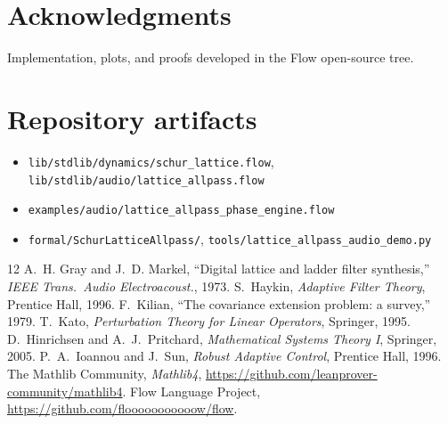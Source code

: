 \documentclass[11pt]{article}
\begin{document}
\section*{Acknowledgments}
Implementation, plots, and proofs developed in the Flow open-source tree.

\appendix
\section{Repository artifacts}
\begin{itemize}
  \item \texttt{lib/stdlib/dynamics/schur\_lattice.flow}, \texttt{lib/stdlib/audio/lattice\_allpass.flow}
  \item \texttt{examples/audio/lattice\_allpass\_phase\_engine.flow}
  \item \texttt{formal/SchurLatticeAllpass/}, \texttt{tools/lattice\_allpass\_audio\_demo.py}
\end{itemize}

\begin{thebibliography}{12}
 A.~H. Gray and J.~D. Markel, ``Digital lattice and ladder filter synthesis,'' \emph{IEEE Trans.\ Audio Electroacoust.}, 1973.
 S.~Haykin, \emph{Adaptive Filter Theory}, Prentice Hall, 1996.
 F.~Kilian, ``The covariance extension problem: a survey,'' 1979.
 T.~Kato, \emph{Perturbation Theory for Linear Operators}, Springer, 1995.
 D.~Hinrichsen and A.~J.~Pritchard, \emph{Mathematical Systems Theory I}, Springer, 2005.
 P.~A.~Ioannou and J.~Sun, \emph{Robust Adaptive Control}, Prentice Hall, 1996.
 The Mathlib Community, \emph{Mathlib4}, \url{https://github.com/leanprover-community/mathlib4}.
 Flow Language Project, \url{https://github.com/flooooooooooow/flow}.
\end{thebibliography}
\end{document}
